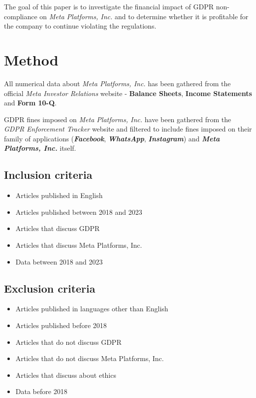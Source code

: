 \documentclass[12pt, a4paper]{article}
\begin{document}
The goal of this paper is to investigate the financial impact of GDPR
non-compliance on \textit{Meta Platforms, Inc.} and to determine whether it is
profitable for the company to continue violating the regulations.

\section*{Method}

All numerical data about \textit{Meta Platforms, Inc.} has been gathered from
the official \textit{Meta Investor Relations} website\cite{fbMetaFinancials} -
\textbf{Balance Sheets}, \textbf{Income Statements} and \textbf{Form 10-Q}.

GDPR fines imposed on \textit{Meta Platforms, Inc.} have been gathered from the
\textit{GDPR Enforcement Tracker}
website\cite{enforcementtrackerGDPREnforcement} and filtered to include fines
imposed on their family of applications (\textbf{\textit{Facebook}},
\textbf{\textit{WhatsApp}}, \textbf{\textit{Instagram}}) and
\textbf{\textit{Meta Platforms, Inc.}} itself.

\subsection*{Inclusion criteria}

\begin{itemize}
    \item Articles published in English
    \item Articles published between 2018 and 2023
    \item Articles that discuss GDPR
    \item Articles that discuss Meta Platforms, Inc.
    \item Data between 2018 and 2023
\end{itemize}

\subsection*{Exclusion criteria}

\begin{itemize}
    \item Articles published in languages other than English
    \item Articles published before 2018
    \item Articles that do not discuss GDPR
    \item Articles that do not discuss Meta Platforms, Inc.
    \item Articles that discuss about ethics
    \item Data before 2018
\end{itemize}
\end{document}
